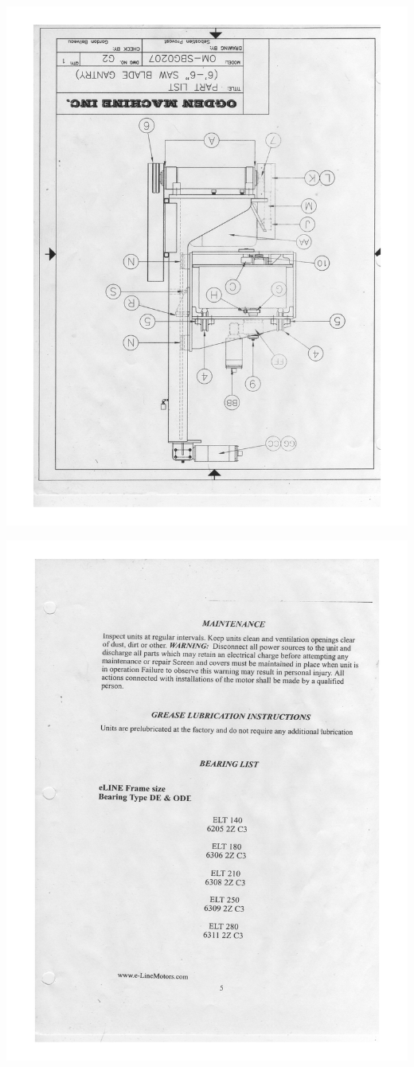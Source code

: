 \begin{center}
	\includegraphics[width=6.0in]{afiles/manold7.pdf}
	\label{om7} %
\end{center}
\begin{center}
	\includegraphics[width=6.0in]{afiles/manold8.pdf}
	\label{om8} %
\end{center}